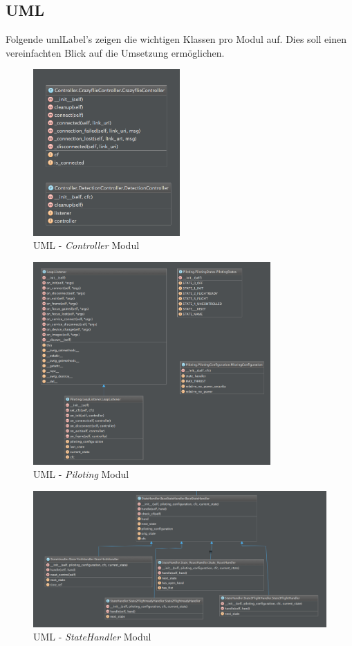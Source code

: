 \subsection{UML}
Folgende \gls{umlLabel}'s zeigen die wichtigen Klassen pro Modul auf. Dies soll einen vereinfachten Blick auf die Umsetzung ermöglichen.

\begin{figure}[H]
	\centering
	\includegraphics[width=0.5\textwidth]{figures/poc/uml/controller.png}
	\caption{UML - \textit{Controller} Modul}
\end{figure}

\begin{figure}[H]
	\centering
	\includegraphics[width=0.81\textwidth]{figures/poc/uml/piloting.png}
	\caption{UML - \textit{Piloting} Modul}
\end{figure}

\begin{figure}[H]
	\centering
	\includegraphics[width=1.0\textwidth]{figures/poc/uml/stateHandler.png}
	\caption{UML - \textit{StateHandler} Modul}
\end{figure}
